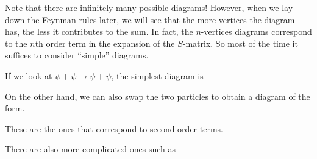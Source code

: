 \documentclass[a4paper]{article}
\begin{document}
Note that there are infinitely many possible diagrams! However, when we lay down the Feynman rules later, we will see that the more vertices the diagram has, the less it contributes to the sum. In fact, the $n$-vertices diagrams correspond to the $n$th order term in the expansion of the $S$-matrix. So most of the time it suffices to consider ``simple'' diagrams.

\begin{eg}
  If we look at $\psi + \psi \to \psi + \psi$, the simplest diagram is
  \begin{center}
  \end{center}
  On the other hand, we can also swap the two particles to obtain a diagram of the form.
  \begin{center}
  \end{center}
  These are the ones that correspond to second-order terms.

  There are also more complicated ones such as
  \begin{center}
\end{center}
\end{eg}
\end{document}
